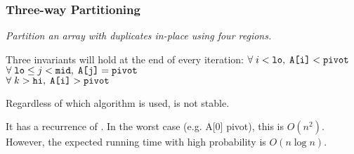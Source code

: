  \subsubsection{Three-way Partitioning}
 \emph{Partition an array with duplicates in-place using four regions.}

Three invariants will hold at the end of every iteration:\linebreak
$\forall \; i < \texttt{lo}, \; \texttt{A[i]} < \texttt{pivot}$\\
$\forall \; \texttt{lo} \leq j < \texttt{mid}, \; \texttt{A[j]} = \texttt{pivot}$\\
$\forall \; k > \texttt{hi}, \; \texttt{A[i]} > \texttt{pivot}$

Regardless of which  algorithm is used,  is not stable.

It has a recurrence of . In the worst case (e.g. A[0] pivot), this is $O(n^2)$.
However, the expected running time with high probability is $O(n \log n)$.